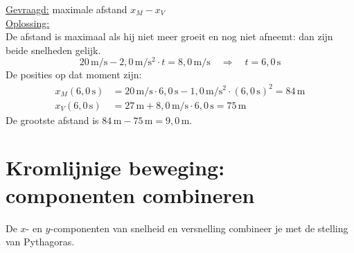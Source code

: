 \documentclass{ximera}
\begin{document}
\begin{exercise}
\begin{question}
\begin{solution}
            \underline{Gevraagd:} maximale afstand $x_M - x_V$\\

            \underline{Oplossing:}\\
            De afstand is maximaal als hij niet meer groeit en nog niet afneemt: dan zijn beide snelheden gelijk.
            \[
                20 \, \mathrm{m/s} - 2{,}0 \, \mathrm{m/s^2} \cdot t = 8{,}0 \, \mathrm{m/s} \quad \Rightarrow \quad t = 6{,}0 \, \mathrm{s}
            \]
            De posities op dat moment zijn:
            \begin{align*}
                x_M(6{,}0 \, \mathrm{s}) &= 20 \, \mathrm{m/s} \cdot 6{,}0 \, \mathrm{s} - 1{,}0 \, \mathrm{m/s^2} \cdot (6{,}0 \, \mathrm{s})^{2} = 84 \, \mathrm{m}\\
                x_V(6{,}0 \, \mathrm{s}) &= 27 \, \mathrm{m} + 8{,}0 \, \mathrm{m/s} \cdot 6{,}0 \, \mathrm{s} = 75 \, \mathrm{m}
            \end{align*}
            De grootste afstand is $84 \, \mathrm{m} - 75 \, \mathrm{m} = \boxed{9{,}0 \, \mathrm{m}}$.
        \end{solution}
    \end{question}
\end{exercise}
\section{Kromlijnige beweging: componenten combineren}
De $x$- en $y$-componenten van snelheid en versnelling combineer je met de stelling van Pythagoras.
\end{document}
